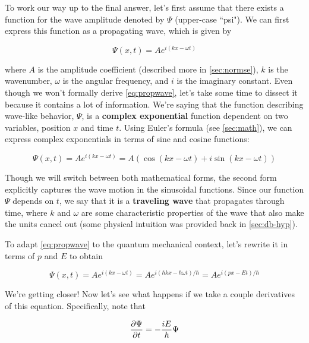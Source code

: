 To work our way up to the final answer, let's first assume that there exists a function for the wave amplitude denoted by $\Psi$ (upper-case ``psi"). 
We can first express this function as a propagating wave, which is given by

\begin{equation}
	\Psi(x,t) = Ae^{i(kx-\omega t)} \label{eq:propwave}
\end{equation}

\noindent where $A$ is the amplitude coefficient (described more in  \autoref{sec:normse}), $k$ is the wavenumber, $\omega$ is the angular frequency, and $i$ is the imaginary constant. 
Even though we won't formally derive \autoref{eq:propwave}, let's take some time to dissect it because it contains a lot of information. 
We're saying that the function describing wave-like behavior, $\Psi$, is a \textbf{complex exponential} function dependent on two variables, position $x$ and time $t$. 
Using Euler's formula (see \autoref{sec:math}), we can express complex exponentials in terms of sine and cosine functions:

\begin{equation*}
	\Psi(x,t) = Ae^{i(kx-\omega t)} = A\left(\cos(kx-\omega t) + i\sin(kx-\omega t)\right)
\end{equation*}

Though we will switch between both mathematical forms, the second form explicitly captures the wave motion in the sinusoidal functions. 
Since our function $\Psi$ depends on $t$, we say that it is a \textbf{traveling wave} that propagates through time, where $k$ and $\omega$ are some characteristic properties of the wave that also make the units cancel out (some physical intuition was provided back in \autoref{sec:db-hyp}). 

To adapt \autoref{eq:propwave} to the quantum mechanical context, let's rewrite it in terms of $p$ and $E$ to obtain

\begin{equation}
	\Psi(x,t) = Ae^{i(kx-\omega t)} = Ae^{i(\hbar kx - \hbar\omega t)/\hbar}  = Ae^{i(px-Et)/\hbar} \label{eq:qwave}
\end{equation}

We're getting closer! 
Now let's see what happens if we take a couple derivatives of this equation. 
Specifically, note that

\begin{equation}
	\pdv{\Psi}{t} = -\frac{iE}{\hbar}\Psi 		\label{eq:qwvdt}
\end{equation}

